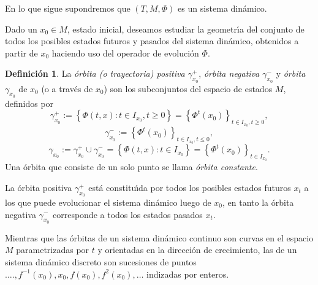 \documentclass[11pt]{book}
\theoremstyle{definition}
\newtheorem{definition}{Definición}
\numberwithin{definition}{section}
\theoremstyle{theorem}
\numberwithin{theorem}{section}
\numberwithin{lemma}{section}
\numberwithin{corollary}{section}
\theoremstyle{plain}
\numberwithin{example}{section}
\begin{document}
En lo que sigue supondremos que $\left( T, M, \Phi \right)$ es un sistema
din\'amico.

Dado un $x_0 \in M$, estado inicial, deseamos estudiar la geometr\'{\i}a del
conjunto de todos los posibles estados futuros y pasados del sistema
din\'amico, obtenidos a partir de $x_0$ haciendo uso del operador de
evoluci\'on $\Phi$.

\begin{definition}
  \label{def:orbit}La {\emph{\'orbita (o trayectoria) positiva
  $\gamma^+_{x_0}$}}, {\emph{\'orbita negativa $\gamma^-_{x_0}$}} y
  {\emph{\'orbita $\gamma_{x_0}$}} de $x_0$ (o a trav\'es de $x_0$) son
  los subconjuntos del espacio de estados $M$, definidos por
  \[ \gamma^+_{x_0} := \left\{ \Phi \left( t, x \right) : t \in I_{x_0},
     t \geq 0 \right\} = \left\{ \Phi^t \left( x_0 \right) \right\}_{t
     \in I_{x_0}, t \geq 0}, \]
  \[ \gamma^-_{x_0} := \left\{ \Phi^t \left( x_0 \right) \right\}_{t \in
     I_{x_0}, t \leq 0}, \]
  \[ \gamma_{x_0} := \gamma_{x_0}^+ \cup \gamma_{x_0}^- = \left\{ \Phi
     \left( t, x \right) : t \in I_{x_0} \right\} = \left\{ \Phi^t \left( x_0
     \right) \right\}_{t \in I_{x_0}} . \]
  Una \'orbita que consiste de un solo punto se llama {\emph{\'orbita
  constante}}.
\end{definition}

La \'orbita positiva $\gamma^+_{x_0}$ est\'a constitu\'{\i}da por todos los
posibles estados futuros $x_t$ a los que puede evolucionar el sistema
din\'amico luego de $x_0$, en tanto la \'orbita negativa $\gamma_{x_0}^-$
corresponde a todos los estados pasados $x_t$.

Mientras que las \'orbitas de un sistema din\'amico continuo son curvas en el
espacio $M$ parametrizadas por $t$ y orientadas en la direcci\'on de
crecimiento, las de un sistema din\'amico discreto son sucesiones de puntos
$\ldots ., f^{- 1} \left( x_0 \right), x_0, f \left( x_0 \right), f^2 \left(
x_0 \right), \ldots$ indizadas por enteros.
\end{document}
